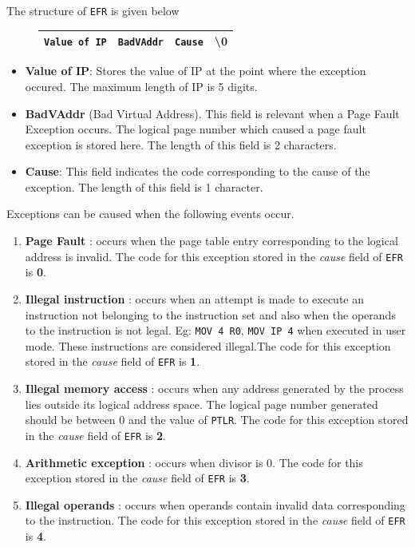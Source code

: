 \documentclass[11pt]{report}
\begin{document}
The structure of \texttt{EFR} is given below
		\begin{figure}[htp!]
		\centering
		\begin{tabular}{|c|c|c|c|}
		\hline
		\texttt{Value of IP} & \texttt{BadVAddr} & \texttt{Cause} &  \textbackslash 0 \\
		\hline
		\end{tabular}
		\end{figure}

\begin{itemize}
\item \textbf{Value of IP}: Stores the value of IP at the point where the exception occured. The maximum length of IP is 5 digits.
\item \textbf{BadVAddr} (Bad Virtual Address). This field is relevant when a Page Fault Exception occurs. The logical page number which caused a page fault exception is stored here. The length of this field is 2 characters.
\item \textbf{Cause}: This field indicates the code corresponding to the cause of the exception. The length of this field is 1 character.
\end{itemize}

Exceptions can be caused when the following events occur.

\begin{enumerate}
\item \textbf{Page Fault} : occurs when the page table entry corresponding to the logical address is invalid. The code for this exception stored in the \textit{cause} field of \texttt{EFR} is \textbf{0}.

\item \textbf{Illegal instruction} : occurs when an attempt is made to execute an instruction not belonging to the instruction set and also when the operands to the instruction is not legal. Eg: \texttt{MOV 4 R0}, \texttt{MOV IP 4} when executed in user mode. These instructions are considered illegal.The code for this exception stored in the \textit{cause} field of \texttt{EFR} is \textbf{1}.

\item \textbf{Illegal memory access} : occurs when any address generated by the process lies outside its logical address space. The logical page number generated should be between 0 and the value of \texttt{PTLR}. The code for this exception stored in the \textit{cause} field of \texttt{EFR} is \textbf{2}.

\item \textbf{Arithmetic exception} : occurs when divisor is 0. The code for this exception stored in the \textit{cause} field of \texttt{EFR} is \textbf{3}.

\item \textbf{Illegal operands} : occurs when operands contain invalid data corresponding to the instruction. The code for this exception stored in the \textit{cause} field of \texttt{EFR} is \textbf{4}.



\end{enumerate}
\end{document}
